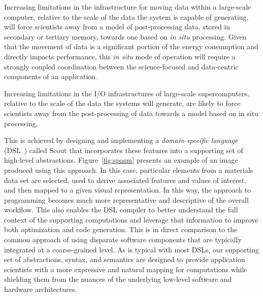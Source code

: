 \documentclass{tcvg}
\begin{document}
   Increasing limitations in the infrastructure for moving data within a 
   large-scale computer, relative to the scale of the data the system is 
   capable of generating, will force scientists away from a model of 
   post-processing data, stored in secondary or tertiary memory,
   towards one based on \emph{in situ} processing.  Given that the movement of 
   data is a significant portion of the energy consumption and directly 
   impacts performance, this \emph{in situ} mode of operation will require 
   a strongly coupled coordination between the science-focused and 
   data-centric components of an application. 
    
   Increasing limitations 
   in the I/O infrastructures of large-scale supercomputers, relative to the 
   scale of the data the systems will generate, are likely to force scientists 
   away from the post-processing of data towards a model based on in situ 
   processing. 


    This is achieved by designing and implementing a
   \emph{domain-specific language} (DSL~\cite{Fowler:DSL:2010}) called
   Scout that incorporates these features into a supporting
   set of high-level abstractions.  Figure~\ref{fig:spasm} presents an
   example of an image produced using this approach. In this case,  
   particular elements from a materials data set are selected, used to derive associated
   features and values of interest, and then mapped to a given visual
   representation.  In this way, the approach to programming becomes
   much more representative and descriptive of the overall workflow.
   This also enables the DSL compiler to better understand the full
   context of the supporting computations and leverage that information
   to improve both optimization and code generation.  This is in direct 
   comparison to the common approach of using disparate software components 
   that are typically integrated at a coarse-grained level.  As is typical with 
   most DSLs, our supporting set of abstractions, syntax, and semantics 
   are designed to provide application scientists with a more expressive 
   and natural mapping for computations while shielding them from the nuances
   of the underlying low-level software and hardware architectures.
\end{document}
